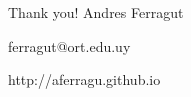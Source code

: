 \documentclass[aspectratio=169]{beamer}
\newenvironment*{myitem}[1][1.5em]{\begin{itemize}\setlength{\itemsep}{#1}}{\end{itemize}}
\begin{document}
	
		



\begin{frame}[plain]
	\vfill
	{\Huge \alert{Thank you!}}
	\vfill
	Andres Ferragut

	ferragut@ort.edu.uy
	
	\alert{http://aferragu.github.io}
\end{frame}
\end{document}
